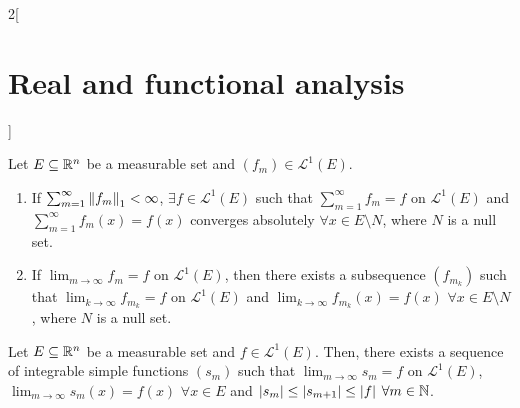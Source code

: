 \documentclass[../../../main_math.tex]{subfiles}
\begin{document}
\begin{multicols}{2}[\section{Real and functional analysis}]
  \begin{theorem}
    Let $E\subseteq\mathbb{R}^n$ be a measurable set and $(f_m)\in \mathcal{L}^1(E)$.
    \begin{enumerate}
      \item If $\sum_{m=1}^\infty {\left\|f_m\right\|}_1<\infty$, $\exists f\in \mathcal{L}^1(E)$ such that $\sum_{m=1}^\infty f_m =f$ on $ \mathcal{L}^1(E)$ and $\sum_{m=1}^\infty f_m(x)=f(x)$ converges absolutely $\forall x\in E\setminus N$, where $N$ is a null set.
      \item If $\displaystyle\lim_{m\to\infty} f_m=f$ on $ \mathcal{L}^1(E)$, then there exists a subsequence $(f_{m_k})$ such that $\displaystyle\lim_{k\to\infty} f_{m_k}=f$ on $ \mathcal{L}^1(E)$ and  $\displaystyle\lim_{k\to\infty} f_{m_k}(x)=f(x)$ $\forall x\in E\setminus N$, where $N$ is a null set.
    \end{enumerate}
  \end{theorem}
  \begin{proposition}
    Let $E\subseteq\mathbb{R}^n$ be a measurable set and $f\in \mathcal{L}^1(E)$. Then, there exists a sequence of integrable simple functions $(s_m)$ such that $\displaystyle\lim_{m\to\infty} s_m=f$ on $ \mathcal{L}^1(E)$, $\displaystyle\lim_{m\to\infty} s_m(x)=f(x)$ $\forall x\in E$ and $\abs{s_m}\leq\abs{s_{m+1}}\leq \abs{f}$ $\forall m\in\mathbb{N}$.
  \end{proposition}

\end{multicols}
\end{document}
